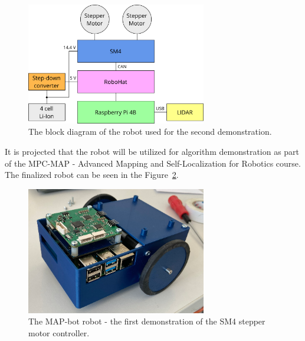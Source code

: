 \begin{figure}[H]
    \centering
    \includegraphics[width=0.7\textwidth]{obrazky/mapbot_block_diag}
    \caption{The block diagram of the robot used for the second demonstration.}
    \label{fig:mapbot_block}
\end{figure}

It is projected that the robot will be utilized for algorithm demonstration as part of the MPC-MAP - Advanced Mapping and Self-Localization for Robotics course.
The finalized robot can be seen in the Figure~\ref{fig:map_bot}.

\begin{figure}[H]
    \centering
    \includegraphics[width=0.7\textwidth]{obrazky/map_bot}
    \caption{The MAP-bot robot - the first demonstration of the SM4 stepper motor controller.}
    \label{fig:map_bot}
\end{figure}
